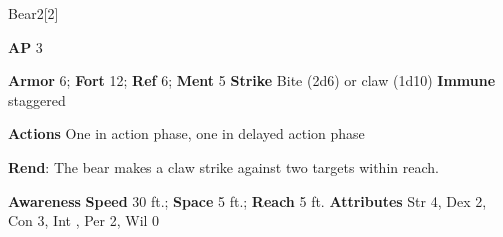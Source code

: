 \begin{monsection}[Black]{Bear}{2}[2]
\vspace{-1em}\vspace{-1em}
\begin{spellcontent}
\begin{spelltargetinginfo}
{\textbf{AP} 3}

\pari \textbf{Armor} 6;
\textbf{Fort} 12;
\textbf{Ref} 6;
\textbf{Ment} 5
\pari \textbf{Strike} Bite  (2d6) or claw  (1d10)
\pari \textbf{Immune} staggered

\pari \textbf{Actions} One in action phase, one in delayed action phase
\end{spelltargetinginfo}


\begin{spelleffects}

\pari
\textbf{Rend}:
The bear makes a claw strike against two targets within reach.



\end{spelleffects}

\end{spellcontent}

\begin{monsterfooter}
\pari \textbf{Awareness} 
\pari \textbf{Speed} 30 ft.;
\textbf{Space} 5 ft.;
\textbf{Reach} 5 ft.
\pari \textbf{Attributes}
Str 4,
Dex 2,
Con 3,
Int ,
Per 2,
Wil 0
\end{monsterfooter}
\end{monsection}



